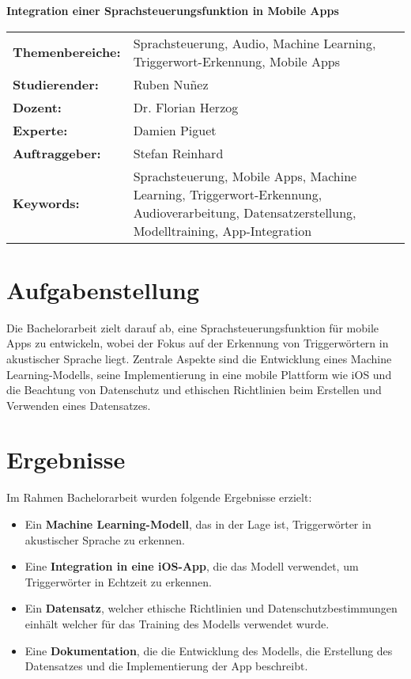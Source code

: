 \documentclass[11pt,a4paper]{article}
\newcommand{\titleformat}{\fontsize{18pt}{22pt}\selectfont}
\newcommand{\bodytextformat}{\fontsize{10pt}{12pt}\selectfont}
\begin{document}
\begin{flushleft}
    {\titleformat\textbf{Integration einer Sprachsteuerungsfunktion in Mobile Apps}}\\[0.5cm]
  \end{flushleft}

\bodytextformat

\noindent
\begin{tabularx}{\linewidth}{@{}p{4cm}X@{}}
    \textbf{Themenbereiche:} & Sprachsteuerung, Audio, Machine Learning, Triggerwort-Erkennung, Mobile Apps \\
    \textbf{Studierender:} & Ruben Nuñez \\
    \textbf{Dozent:} & Dr. Florian Herzog \\
    \textbf{Experte:} & Damien Piguet \\
    \textbf{Auftraggeber:} & Stefan Reinhard \\
    \textbf{Keywords:} & Sprachsteuerung, Mobile Apps, Machine Learning, Triggerwort-Erkennung, Audioverarbeitung, Datensatzerstellung, Modelltraining, App-Integration \\
\end{tabularx}
    




\section{Aufgabenstellung}
Die Bachelorarbeit zielt darauf ab, eine Sprachsteuerungsfunktion für mobile Apps zu entwickeln, wobei der Fokus auf der Erkennung von Triggerwörtern in akustischer Sprache liegt. Zentrale Aspekte sind die Entwicklung eines Machine Learning-Modells, seine Implementierung in eine mobile Plattform wie iOS und die Beachtung von Datenschutz und ethischen Richtlinien beim Erstellen und Verwenden eines Datensatzes.


\section{Ergebnisse}
Im Rahmen Bachelorarbeit wurden folgende Ergebnisse erzielt:

\begin{itemize}
    \item Ein \textbf{Machine Learning-Modell}, das in der Lage ist, Triggerwörter in akustischer Sprache zu erkennen.
    \item Eine \textbf{Integration in eine iOS-App}, die das Modell verwendet, um Triggerwörter in Echtzeit zu erkennen.
    \item Ein \textbf{Datensatz}, welcher ethische Richtlinien und Datenschutzbestimmungen einhält welcher für das Training des Modells verwendet wurde.
    \item Eine \textbf{Dokumentation}, die die Entwicklung des Modells, die Erstellung des Datensatzes und die Implementierung der App beschreibt.
  
\end{itemize}
\end{document}
